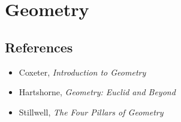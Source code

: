 \section{Geometry}
\subsection*{References}
\begin{itemize}
    \item Coxeter, \emph{Introduction to Geometry}
    \item Hartshorne, \emph{Geometry: Euclid and Beyond}
    \item Stillwell, \emph{The Four Pillars of Geometry}
\end{itemize}
